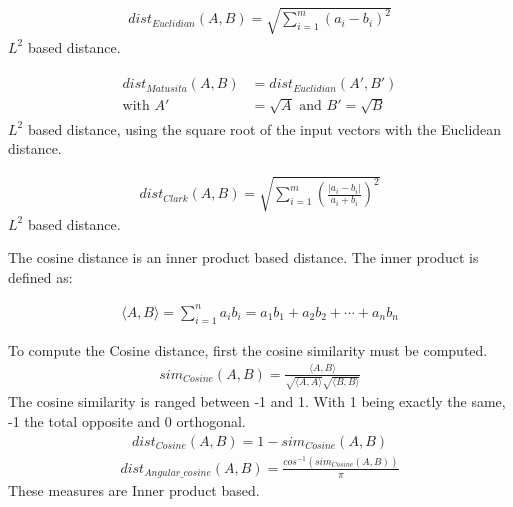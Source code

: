 \begin{definition}
  \begin{gather*}
    dist_{Euclidian}(A, B) = \sqrt{\sum_{i=1}^{m}(a_i - b_i)^2}
  \end{gather*}
  $L^2$ based distance.
\end{definition}

\begin{definition}
  \begin{gather*}
    \begin{split}
      dist_{Matusita}(A, B) &= dist_{Euclidian}(A', B') \\
      \text{with }A' &= \sqrt{A}\text{ and }B' = \sqrt{B}
    \end{split}
  \end{gather*}
  $L^2$ based distance, using the square root of the input vectors with the Euclidean distance.
\end{definition}

\begin{definition}
  \begin{gather*}
    dist_{Clark}(A, B) = \sqrt{\sum_{i=1}^{m}\left(\frac{|a_i - b_i|}{a_i + b_i}\right)^2}
  \end{gather*}
  $L^2$ based distance.
\end{definition}

\begin{definition}
  \label{def:cosine_dist}
  The cosine distance is an inner product based distance.
  The inner product is defined as:

  \begin{gather*}
    \langle A, B \rangle = \sum_{i=1}^{n} a_i b_i = a_1 b_1 + a_2 b_2 + \cdots + a_n b_n
  \end{gather*}

  To compute the Cosine distance, first the cosine similarity must be computed.
  \begin{gather*}
    sim_{Cosine}(A, B) = \frac{\langle A, B \rangle}{\sqrt{\langle A , A \rangle}\sqrt{\langle B, B \rangle}}
  \end{gather*}
  The cosine similarity is ranged between -1 and 1.
  With 1 being exactly the same, -1 the total opposite and 0 orthogonal.
  \begin{gather*}
    dist_{Cosine}(A, B) = 1 - sim_{Cosine}(A, B)
  \end{gather*}
  \begin{gather*}
    dist_{Angular\_cosine}(A, B) = \frac{cos^{-1}\left( sim_{Cosine}(A, B) \right)}{\pi}
  \end{gather*}
  These measures are Inner product based.
\end{definition}

